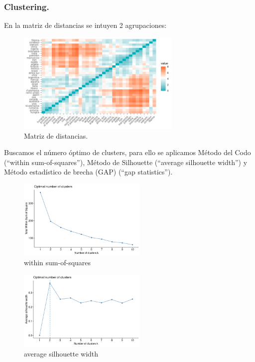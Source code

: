 \documentclass[11pt,a4paper]{article}
\begin{document}
    \subsubsection{Clustering.}
    En la matriz de distancias se intuyen 2 agrupaciones:
    \begin{figure}[H]
		\centering
		\includegraphics[width=0.7\textwidth]{images/dist_matrix}
		\caption{Matriz de distancias.}
	\end{figure}
	
	Buscamos el número óptimo de clusters, para ello se aplicamos Método del Codo (``within sum-of-squares''), Método de Silhouette (``average silhouette width'') y Método estadístico de brecha (GAP) (``gap statistics'').
	
	\begin{figure}[H]
		\centering
		\includegraphics[width=0.55\textwidth]{images/wss}
		\caption{within sum-of-squares}
	\end{figure}
	
	\begin{figure}[H]
		\centering
		\includegraphics[width=0.55\textwidth]{images/silhouette}
		\caption{average silhouette width}
	\end{figure}
	
\end{document}
